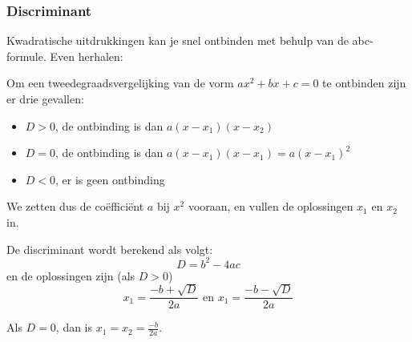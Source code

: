 \subsubsection{Discriminant}
Kwadratische uitdrukkingen kan je snel ontbinden met behulp van de abc-formule. Even herhalen:

\begin{definitie}
	Om een tweedegraadsvergelijking van de vorm $ax^2+bx+c=0$ te ontbinden zijn er drie gevallen:

\begin{itemize}
	\item $D>0$, de ontbinding is dan $a(x-x_1)(x-x_2)$
	\item $D=0$, de ontbinding is dan $a(x-x_1)(x-x_1)=a(x-x_1)^2$
	\item $D<0$, er is geen ontbinding
\end{itemize}

We zetten dus de co\"effici\"ent $a$ bij $x^2$ vooraan, en vullen de oplossingen  $x_1$ en $x_2$ in.

De discriminant wordt berekend als volgt:
\begin{equation*}
D=b^2-4ac
\end{equation*}
en de oplossingen zijn (als $D>0$)
\begin{equation*}
x_1=\frac{-b+\sqrt{D}}{2a} \text{ en } x_1=\frac{-b-\sqrt{D}}{2a}
\end{equation*}

Als $D=0$, dan is $x_1=x_2=\frac{-b}{2a}$.

\end{definitie}

